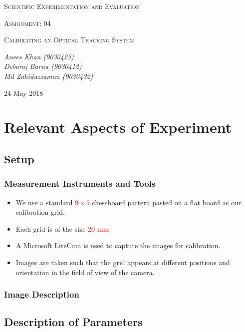\documentclass[10pt,a4paper]{article}
\begin{document}
	\begin{titlepage}
	\centering
	
		{\scshape\LARGE Scientific Experimentation and Evaluation\par}
		\vfill
		{\scshape\Large Assignment: 04\par}
		{\scshape\Large Calibrating an Optical Tracking System\par}
		\vfill
	
		\vfill
		{\Large\itshape Anees Khan (9030423)
			\\Debaraj Barua (9030412)\\
			Md Zahiduzzaman (9030432)
			\par}
		\vfill
	
		{\large 24-May-2018\par}
	\end{titlepage}
	\tableofcontents
	\newpage
	\section{Relevant Aspects of Experiment}
		\subsection{Setup}
			\subsubsection{Measurement Instruments and Tools}
				\begin{itemize}
					\item We use a standard \textcolor{red}{$9 \times5$} chessboard pattern pasted on a flat board as our calibration grid.
					\item Each grid is of the size \textcolor{red}{20 mm}
					\item A Microsoft LiteCam is used to capture the images for calibration.  
					\item Images are taken such that the grid appears at different positions and orientation in the field of view of the camera.
				\end{itemize}
			\subsubsection{Image Description}
		\subsection{Description of Parameters}
\end{document}
